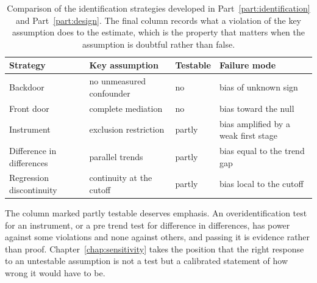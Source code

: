 \begin{table}[t]
\centering
\caption[Comparison of identification strategies]{Comparison of the
identification strategies developed in Part~\ref{part:identification} and
Part~\ref{part:design}. The final column records what a violation of the key
assumption does to the estimate, which is the property that matters when the
assumption is doubtful rather than false.}
\label{tab:criteria-summary}
\small
\begin{tabular}{p{26mm}p{28mm}p{13mm}p{32mm}}
\toprule
Strategy & Key assumption & Testable & Failure mode \\
\midrule
Backdoor & no unmeasured confounder & no & bias of unknown sign \\[2pt]
Front door & complete mediation & no & bias toward the null \\[2pt]
Instrument & exclusion restriction & partly & bias amplified by a weak first stage \\[2pt]
Difference in differences & parallel trends & partly & bias equal to the trend gap \\[2pt]
Regression discontinuity & continuity at the cutoff & partly & bias local to the cutoff \\
\bottomrule
\end{tabular}
\end{table}

The column marked partly testable deserves emphasis. An overidentification test
for an instrument, or a pre trend test for difference in differences, has power
against some violations and none against others, and passing it is evidence
rather than proof. Chapter~\ref{chap:sensitivity} takes the position that the
right response to an untestable assumption is not a test but a calibrated
statement of how wrong it would have to be.
